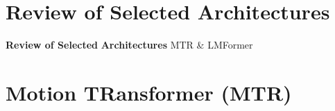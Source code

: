 \documentclass[10pt,aspectratio=169]{beamer}
\begin{document}




\section{Review of Selected Architectures}

\begin{frame}[plain]
  \begin{center}
    \vfill
    {\Huge \textbf{Review of Selected}}
    \vfill
    {\Huge \textbf{Architectures}}
    \vfill
    {\Large MTR \& LMFormer}
    \vfill
  \end{center}
\end{frame}



\section{Motion TRansformer (MTR)}
\end{document}
